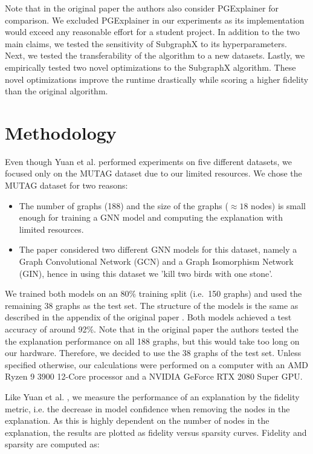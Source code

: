 Note that in the original paper the authors also consider PGExplainer \cite{luo20} for comparison. We excluded PGExplainer in our experiments as its implementation would exceed any reasonable effort for a student project. 
In addition to the two main claims, we tested the sensitivity of SubgraphX to its hyperparameters. 
Next, we tested the transferability of the algorithm to a new datasets. 
Lastly, we empirically tested two novel optimizations to the SubgraphX algorithm. 
These novel optimizations improve the runtime drastically while scoring a higher fidelity than the original algorithm.



\section{Methodology}
Even though Yuan et al. \cite{Yuan21} performed experiments on five different datasets, we focused only on the MUTAG dataset \cite{Debnath1991} due to our limited resources. We chose the MUTAG dataset for two reasons:

\begin{itemize}
\item The number of graphs (188) and the size of the graphs (${\approx}18$ nodes) is small enough for training a GNN model and computing the explanation with limited resources.
\item The paper considered two different GNN models for this dataset, namely a Graph Convolutional Network (GCN) and a Graph Isomorphism Network (GIN), hence in using this dataset we 'kill two birds with one stone'.
\end{itemize}

We trained both models on an $80\%$ training split (i.e.\ 150 graphs) and used the remaining 38 graphs as the test set. 
The structure of the models is the same as described in the appendix of the original paper \cite{Yuan21}. 
Both models achieved a test accuracy of around 92\%.
Note that in the original paper the authors tested the the explanation performance on all 188 graphs, but this would take too long on our hardware.
Therefore, we decided to use the 38 graphs of the test set. 
Unless specified otherwise, our calculations were performed on a computer with an AMD Ryzen 9 3900 12-Core processor and a NVIDIA GeForce RTX 2080 Super GPU.

Like Yuan et al. \cite{Yuan21}, we measure the performance of an explanation by the fidelity metric, i.e. the decrease in model confidence when removing the nodes in the explanation. As this is highly dependent on the number of nodes in the explanation, the results are plotted as fidelity versus sparsity curves. Fidelity and sparsity are computed as:

